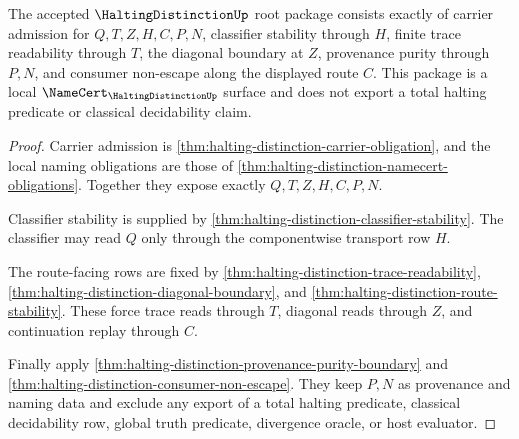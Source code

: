 \begin{theorem}
\label{thm:halting-distinction-namecert-root-package}
The accepted $\HaltingDistinctionUp$ root package consists exactly of carrier admission for $Q,T,Z,H,C,P,N$, classifier stability through $H$, finite trace readability through $T$, the diagonal boundary at $Z$, provenance purity through $P,N$, and consumer non-escape along the displayed route $C$. This package is a local $\NameCert_{\HaltingDistinctionUp}$ surface and does not export a total halting predicate or classical decidability claim.
\end{theorem}
\begin{proof}
Carrier admission is \autoref{thm:halting-distinction-carrier-obligation}, and the local naming obligations are those of \autoref{thm:halting-distinction-namecert-obligations}. Together they expose exactly $Q,T,Z,H,C,P,N$.

Classifier stability is supplied by \autoref{thm:halting-distinction-classifier-stability}. The classifier may read $Q$ only through the componentwise transport row $H$.

The route-facing rows are fixed by \autoref{thm:halting-distinction-trace-readability}, \autoref{thm:halting-distinction-diagonal-boundary}, and \autoref{thm:halting-distinction-route-stability}. These force trace reads through $T$, diagonal reads through $Z$, and continuation replay through $C$.

Finally apply \autoref{thm:halting-distinction-provenance-purity-boundary} and \autoref{thm:halting-distinction-consumer-non-escape}. They keep $P,N$ as provenance and naming data and exclude any export of a total halting predicate, classical decidability row, global truth predicate, divergence oracle, or host evaluator.
\end{proof}

